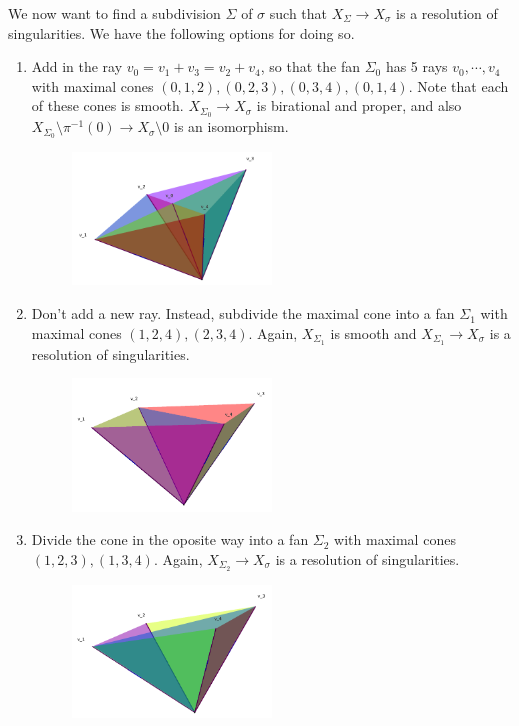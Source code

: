 \documentclass[a4paper,12pt]{amsart}
\begin{document}
We now want to find a subdivision $\Sigma$ of $\sigma$ such that $X_{\Sigma}\rightarrow X_\sigma$ is a resolution of singularities. We have the following options for doing so.
\begin{enumerate}
	\item  Add in the ray $v_0=v_1+v_3=v_2+v_4$, so that the fan $\Sigma_0$ has 5 rays $v_0,\cdots,v_4$ with maximal cones $(0,1,2),(0,2,3),(0,3,4),(0,1,4)$.
	Note that each of these cones is smooth. $X_{\Sigma_0}\rightarrow X_\sigma$ is birational and proper, and also $X_{\Sigma_0}\setminus\pi^{-1}(0)\rightarrow X_\sigma\setminus0$ is an isomorphism.
	
	\begin{figure}[h]
		\centering
		\includegraphics[width=0.5\textwidth]{pic/Mar19_fan1}
	\end{figure}
	
	\item Don't add a new ray. Instead, subdivide the maximal cone into a fan $\Sigma_1$ with maximal cones $(1,2,4),(2,3,4)$. Again, $X_{\Sigma_1}$ is smooth and $X_{\Sigma_1}\rightarrow X_\sigma$ is a resolution of singularities.
	
	\begin{figure}[h]
		\centering
		\includegraphics[width=0.5\textwidth]{pic/Mar19_fan2}
	\end{figure}
\vspace{3cm}
	
	\item Divide the cone in the oposite way into a fan $\Sigma_2$ with maximal cones $(1,2,3),(1,3,4)$. Again, $X_{\Sigma_2}\rightarrow X_\sigma$ is a resolution of singularities.
	
	\begin{figure}[h]
		\centering
		\includegraphics[width=0.5\textwidth]{pic/Mar19_fan3}
	\end{figure}
\end{enumerate}
\end{document}
